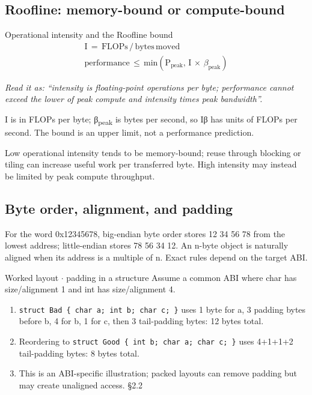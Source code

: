 \documentclass[11pt]{article}
\begin{document}
\begin{keepsection}
\begin{keepsection}
\subsection{Roofline: memory-bound or compute-bound}

\begin{equationcard}{Operational intensity and the Roofline bound}
\[ \begin{gathered} \mathrm{I}\, =\, \text{FLOPs}\, /\, \text{bytes}\, \text{moved} \\ \text{performance}\, \leq \, \text{min}(\mathrm{P}_{\text{peak}},\, \mathrm{I}\, \times \, β_{\text{peak}}) \end{gathered} \]
{\small \emph{Read it as: “intensity is floating-point operations per byte; performance cannot exceed the lower of peak compute and intensity times peak bandwidth”.}\par I is in FLOPs per byte; β\textsubscript{peak} is bytes per second, so Iβ has units of FLOPs per second. The bound is an upper limit, not a performance prediction.}
\end{equationcard}

Low operational intensity tends to be memory-bound; reuse through blocking or tiling can increase useful work per transferred byte. High intensity may instead be limited by peak compute throughput.
\end{keepsection}

\begin{keepsection}
\subsection{Byte order, alignment, and padding}

For the word 0x12345678, big-endian byte order stores 12 34 56 78 from the lowest address; little-endian stores 78 56 34 12. An n-byte object is naturally aligned when its address is a multiple of n. Exact rules depend on the target ABI.

\begin{workedbox}{Worked layout \ensuremath{\cdot} padding in a structure}
Assume a common ABI where char has size/alignment 1 and int has size/alignment 4.

\begin{enumerate}
\item \texttt{struct Bad \{ char a; int b; char c; \}} uses 1 byte for a, 3 padding bytes before b, 4 for b, 1 for c, then 3 tail-padding bytes: 12 bytes total.
\item Reordering to \texttt{struct Good \{ int b; char a; char c; \}} uses 4+1+1+2 tail-padding bytes: 8 bytes total.
\item This is an ABI-specific illustration; packed layouts can remove padding but may create unaligned access. \hfill{\small\color{FAUblue}§2.2}
\end{enumerate}
\end{workedbox}


\end{keepsection}
\end{keepsection}
\end{document}
